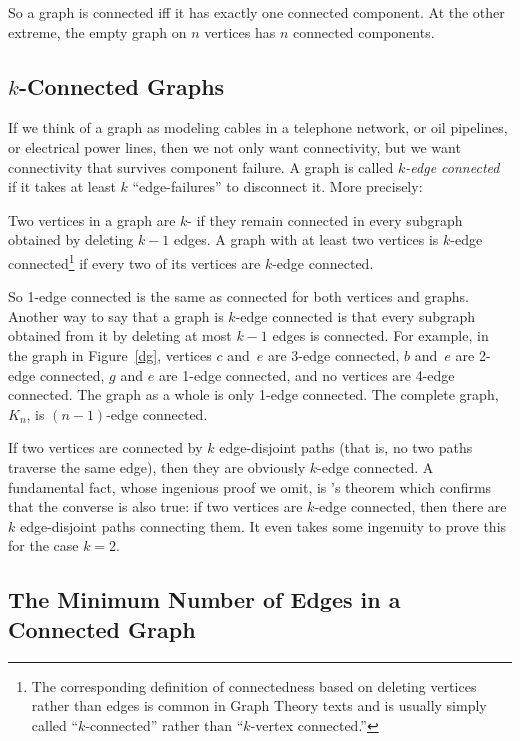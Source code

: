 So a graph is connected iff it has exactly one connected component.
At the other extreme, the empty graph on $n$ vertices has $n$
connected components.

\subsection{$k$-Connected Graphs}

If we think of a graph as modeling cables in a telephone network, or
oil pipelines, or electrical power lines, then we not only want
connectivity, but we want connectivity that survives component
failure.  A graph is called \emph{$k$-edge connected} if it takes at
least $k$ ``edge-failures'' to disconnect it.  More precisely:

\begin{definition}
  Two vertices in a graph are $k$- if they remain
  connected in every subgraph obtained by deleting $k-1$ edges.  A graph
  with at least two vertices is $k$-edge connected\footnote{The
    corresponding definition of connectedness based on deleting vertices
    rather than edges is common in Graph Theory texts and is usually
    simply called ``$k$-connected'' rather than ``$k$-vertex connected.''}
  if every two of its vertices are $k$-edge connected.
\end{definition}

So 1-edge connected is the same as connected for both vertices and
graphs.  Another way to say that a graph is $k$-edge connected is
that every subgraph obtained from it by deleting at most $k-1$ edges
is connected.  For example, in the graph in Figure~\ref{dg},
vertices $c$ and~$e$ are 3-edge connected, $b$ and~$e$ are 2-edge
connected, $g$ and $e$ are 1-edge connected, and no vertices are
4-edge connected.  The graph as a whole is only 1-edge connected.
The complete graph, $K_n$, is $(n-1)$-edge connected.

If two vertices are connected by $k$ edge-disjoint paths (that is, no
two paths traverse the same edge), then they are obviously $k$-edge
connected.  A fundamental fact, whose ingenious proof we omit,
is 's theorem which confirms that the converse is also
true: if two vertices are $k$-edge connected, then there are $k$
edge-disjoint paths connecting them.  It even takes some ingenuity to
prove this for the case $k=2$.

\subsection{The Minimum Number of Edges in a Connected Graph}

